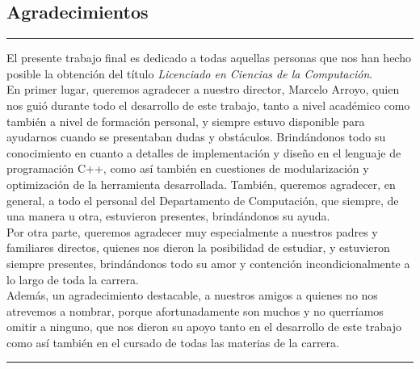\documentclass[a4paper,11pt]{ThesisStyle}
\begin{document}
\begin{vcenterpage}

\section*{Agradecimientos}
\noindent\rule[2pt]{\textwidth}{0.5pt}

El presente trabajo final es dedicado a todas aquellas personas que nos han hecho posible la obtención del título \textit{Licenciado en Ciencias de la Computación}.\\

En primer lugar, queremos agradecer a nuestro director, Marcelo Arroyo, quien nos guió durante todo el desarrollo de este trabajo, tanto a nivel académico como también a nivel de formación personal, y siempre estuvo disponible para ayudarnos cuando se presentaban dudas y obstáculos. Brindándonos todo su conocimiento en cuanto a detalles de implementación y diseño en el lenguaje de programación C++, como así también en cuestiones de modularización y optimización de la herramienta desarrollada.
También, queremos agradecer, en general, a todo el personal del Departamento de Computación, que siempre, de una manera u otra, estuvieron presentes, brindándonos su ayuda.\\

Por otra parte, queremos agradecer muy especialmente a nuestros padres y familiares directos, quienes nos dieron la posibilidad de estudiar, y estuvieron siempre presentes, brindándonos todo su amor y contención incondicionalmente a lo largo de toda la carrera.\\ 

Además, un agradecimiento destacable, a nuestros amigos a quienes no nos atrevemos a nombrar, porque afortunadamente son muchos y no querríamos omitir a ninguno, que nos dieron su apoyo tanto en el desarrollo de este trabajo como así también en el cursado de todas las materias de la carrera. 
\noindent\rule[2pt]{\textwidth}{0.5pt}
\end{vcenterpage}

\cleardoublepage

\tableofcontents

\mainmatter

\appendix
\addappheadtotoc
\appendixpage


\listoffigures
\listoftables
\listofalgorithms
{}

% 
% 



\end{document}
